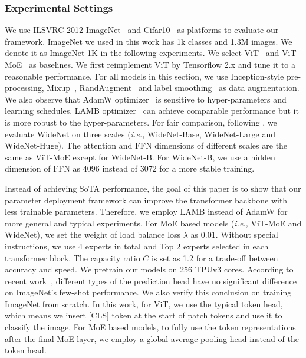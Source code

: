 \documentclass[letterpaper]{article} \usepackage{aaai22}  \usepackage{times}  \usepackage{helvet}  \usepackage{courier}  \usepackage[hyphens]{url}  \usepackage{graphicx} \urlstyle{rm} \def\UrlFont{\rm}  \usepackage{natbib}  \usepackage{caption} \DeclareCaptionStyle{ruled}{labelfont=normalfont,labelsep=colon,strut=off} \frenchspacing  \setlength{\pdfpagewidth}{8.5in}  \setlength{\pdfpageheight}{11in}  \usepackage{algorithm}
\newcommand{\ie}{\emph{i.e.,}\xspace}
\begin{document}
\subsubsection{Experimental Settings}
\label{sec:cv-settings}


We use ILSVRC-2012 ImageNet~\citep{deng2009imagenet} and Cifar10~\citep{krizhevsky2009learning} as platforms to evaluate our framework. ImageNet we used in this work has 1k classes and 1.3M images. We denote it as ImageNet-1K in the following experiments. We select ViT~\citep{dosovitskiy2020image} and ViT-MoE~\citep{riquelme2021scaling} as baselines. We first reimplement ViT by Tensorflow 2.x and tune it to a reasonable performance. For all models in this section, we use Inception-style pre-processing, Mixup~\citep{zhang2017mixup}, RandAugment~\citep{cubuk2020randaugment} and label smoothing~\citep{szegedy2016rethinking,yuan2020revisiting} as data augmentation. We also observe that AdamW optimizer~\citep{loshchilov2017decoupled} is sensitive to hyper-parameters and learning schedules. LAMB optimizer~\citep{you2019large} can achieve comparable performance but it is more robust to the hyper-parameters. For fair comparison, following \citet{zhai2021scaling}, we evaluate WideNet on three scales (\ie WideNet-Base, WideNet-Large and WideNet-Huge). The attention and FFN dimensions of different scales are the same as ViT-MoE except for WideNet-B. For WideNet-B, we use a hidden dimension of FFN as 4096 instead of 3072 for a more stable training.

Instead of achieving SoTA performance, the goal of this paper is to show that our parameter deployment framework can improve the transformer backbone with less trainable parameters. Therefore, we employ LAMB instead of AdamW for more general and typical experiments. For MoE based models (\ie ViT-MoE and WideNet), we set the weight of load balance loss $\lambda$ as 0.01. Without special instructions, we use 4 experts in total and Top 2 experts selected in each transformer block. The capacity ratio $C$ is set as 1.2 for a trade-off between accuracy and speed. We pretrain our models on 256 TPUv3 cores. According to recent work~\citep{zhai2021scaling}, different types of the prediction head have no significant difference on ImageNet's few-shot performance. We also verify this conclusion on training ImageNet from scratch. In this work, for ViT, we use the typical token head, which means we insert [CLS] token at the start of patch tokens and use it to classify the image. For MoE based models, to fully use the token representations after the final MoE layer, we employ a global average pooling head instead of the token head. 
\end{document}
